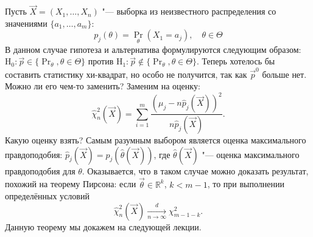 Пусть $\vec{X} = (X_{1}, \ldots, X_{n})$ "--- выборка из неизвестного распределения со значениями $\{a_{1}, \ldots, a_{m}\}$:
\begin{equation}
	p_{j}(\theta) = \Pr_{\theta}(X_{1} = a_{j}), \quad \theta \in \Theta
\end{equation}
В данном случае гипотеза и альтернатива формулируются следующим образом: $\mathrm{H}_{0} \colon \vec{p} \in \{\Pr_{\theta}, \theta \in \Theta\}$ против $\mathrm{H}_{1} \colon \vec{p} \not\in \{\Pr_{\theta}, \theta \in \Theta\}$. Теперь хотелось бы составить статистику хи-квадрат, но особо не получится, так как $\vec{p}^{0}$ больше нет. Можно ли его чем-то заменить? Заменим на оценку:
\begin{equation}
	\hat{\chi}^{2}_{n}(\vec{X}) = \sum_{i = 1}^{m} \frac{(\mu_{j} - n\hat{p}_{j}(\vec{X}))^{2}}{n\hat{p}_{j}(\vec{X})}.
\end{equation}
Какую оценку взять? Самым разумным выбором является оценка максимального правдоподобия: $\hat{p}_{j}(\vec{X}) = p_{j}(\hat{\theta}(\vec{X}))$, где $\hat{\theta}(\vec{X})$ "---  оценка максимального правдоподобия для $\theta$. Оказывается, что в таком случае можно доказать результат, похожий на теорему Пирсона: если $\vec{\theta} \in \mathbb{R}^{k}$, $k < m - 1$, то при выполнении определённых условий
\begin{equation}
	\hat{\chi}^{2}_{n}(\vec{X}) \xrightarrow[n \to \infty]{d} \chi^{2}_{m - 1 - k}.
\end{equation}
Данную теорему мы докажем на следующей лекции.
